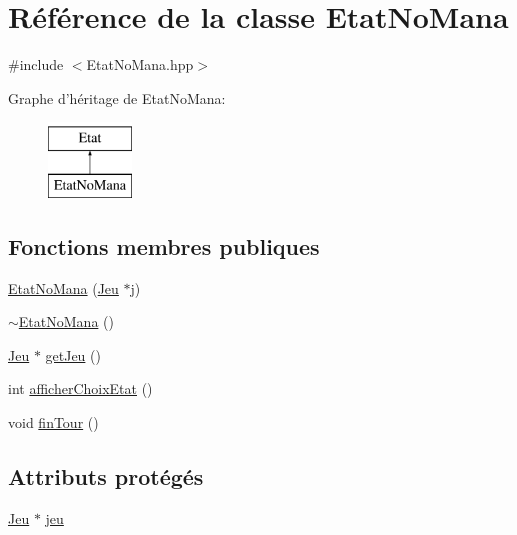 \hypertarget{class_etat_no_mana}{\section{\-Référence de la classe \-Etat\-No\-Mana}
\label{class_etat_no_mana}
}


{\ttfamily \#include $<$\-Etat\-No\-Mana.\-hpp$>$}

\-Graphe d'héritage de \-Etat\-No\-Mana\-:\begin{figure}[H]
\begin{center}
\leavevmode
\includegraphics[height=2.000000cm]{class_etat_no_mana}
\end{center}
\end{figure}
\subsection*{\-Fonctions membres publiques}
\begin{DoxyCompactItemize}
\item 
\hyperlink{class_etat_no_mana_a506d5de276476b23f9c86864b4c439fa}{\-Etat\-No\-Mana} (\hyperlink{class_jeu}{\-Jeu} $\ast$j)
\item 
\hyperlink{class_etat_no_mana_aaae2ecdedcef4451b0a0f7c88aad4c71}{$\sim$\-Etat\-No\-Mana} ()
\item 
\hyperlink{class_jeu}{\-Jeu} $\ast$ \hyperlink{class_etat_no_mana_a153d0656498f8e15d0c550fc4898f5fe}{get\-Jeu} ()
\item 
int \hyperlink{class_etat_no_mana_aa67bb9f558eaef0d07939a4747d12192}{afficher\-Choix\-Etat} ()
\item 
void \hyperlink{class_etat_no_mana_a14567fee07c6c1a541885fcf2499cd56}{fin\-Tour} ()
\end{DoxyCompactItemize}
\subsection*{\-Attributs protégés}
\begin{DoxyCompactItemize}
\item 
\hyperlink{class_jeu}{\-Jeu} $\ast$ \hyperlink{class_etat_no_mana_a8ddcdb9981a36c8baa31d1979272ff72}{jeu}
\end{DoxyCompactItemize}


